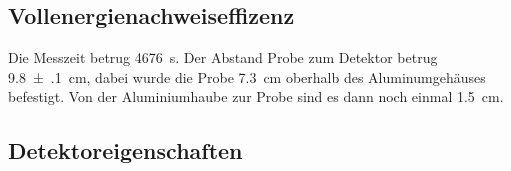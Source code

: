 \subsection{Vollenergienachweiseffizenz}
\label{sec:Vollenergienachweiseffizenz}
Die Messzeit betrug \SI{ 4676}{\second}. Der Abstand Probe zum Detektor betrug
\SI{9.8(1)}{\centi\meter}, dabei wurde die Probe \SI{7.3}{\centi\meter} oberhalb
des Aluminumgehäuses befestigt. Von der Aluminiumhaube zur Probe sind es dann noch
einmal \SI{1.5}{\centi\meter}.

\subsection{Detektoreigenschaften}
\label{sec:Detektoreigenschaften}




